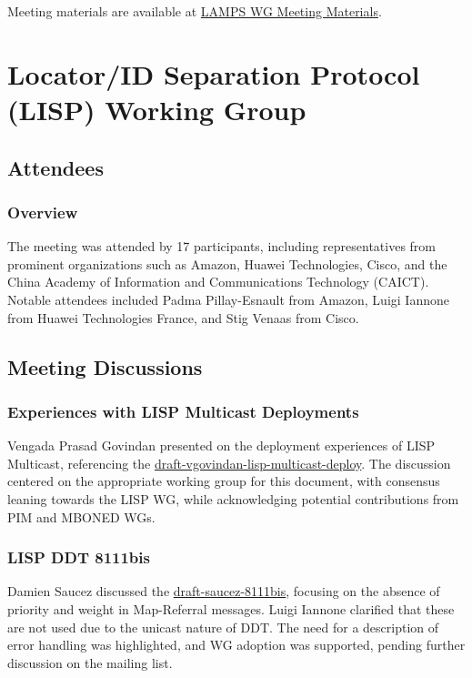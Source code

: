 \documentclass{article}
\begin{document}
Meeting materials are available at \href{https://www.ietf.org/proceedings/122/lamps.html}{LAMPS WG Meeting Materials}.




\newpage

\section{Locator/ID Separation Protocol (LISP) Working Group}

\subsection{Attendees}
\subsubsection{Overview}
The meeting was attended by 17 participants, including representatives from prominent organizations such as Amazon, Huawei Technologies, Cisco, and the China Academy of Information and Communications Technology (CAICT). Notable attendees included Padma Pillay-Esnault from Amazon, Luigi Iannone from Huawei Technologies France, and Stig Venaas from Cisco.

\subsection{Meeting Discussions}

\subsubsection{Experiences with LISP Multicast Deployments}
Vengada Prasad Govindan presented on the deployment experiences of LISP Multicast, referencing the \href{https://datatracker.ietf.org/doc/html/draft-vgovindan-lisp-multicast-deploy}{draft-vgovindan-lisp-multicast-deploy}. The discussion centered on the appropriate working group for this document, with consensus leaning towards the LISP WG, while acknowledging potential contributions from PIM and MBONED WGs.

\subsubsection{LISP DDT 8111bis}
Damien Saucez discussed the \href{https://datatracker.ietf.org/doc/html/draft-saucez-8111bis}{draft-saucez-8111bis}, focusing on the absence of priority and weight in Map-Referral messages. Luigi Iannone clarified that these are not used due to the unicast nature of DDT. The need for a description of error handling was highlighted, and WG adoption was supported, pending further discussion on the mailing list.
\end{document}
